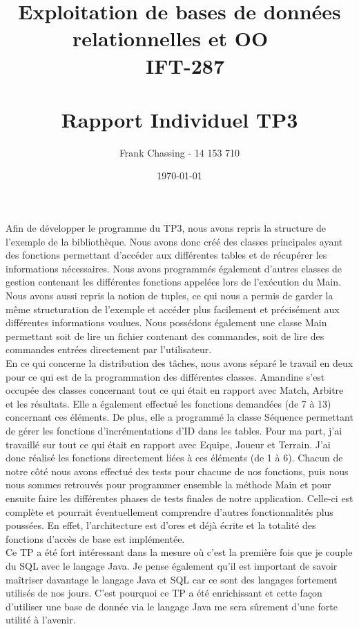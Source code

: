 \documentclass[11pt]{article}
\title{Exploitation de bases de données relationnelles et OO ~\\~\textbf{IFT-287} \\~\\ Rapport Individuel TP3}
\author{Frank Chassing - 14 153 710}
\date{\today}
\begin{document}
\maketitle
Afin de développer le programme du TP3, nous avons repris la structure de l’exemple de la bibliothèque. Nous avons donc créé des classes principales ayant des fonctions permettant d’accéder aux différentes tables et de récupérer les informations nécessaires. Nous avons programmés également d’autres classes de gestion contenant les différentes fonctions appelées lors de l’exécution du Main. Nous avons aussi repris la notion de tuples,  ce qui nous a permis de garder la même structuration de l’exemple et accéder plus facilement et précisément aux différentes informations voulues. Nous possédons également une classe Main permettant soit de lire un fichier contenant des commandes, soit de lire des commandes entrées directement par l’utilisateur.~\\

En ce qui concerne la distribution des tâches, nous avons séparé le travail en deux pour ce qui est de la programmation des différentes classes. Amandine s’est occupée des classes concernant tout ce qui était en rapport avec Match, Arbitre et les résultats. Elle a également effectué les fonctions demandées (de 7 à 13) concernant ces éléments. De plus, elle a programmé la classe Séquence permettant de gérer les fonctions d’incrémentations d’ID dans les tables. Pour ma part, j’ai travaillé sur tout ce qui était en rapport avec Equipe, Joueur et Terrain. J’ai donc réalisé les fonctions directement liées à ces éléments (de 1 à 6). Chacun de notre côté nous avons effectué des tests pour chacune de nos fonctions, puis nous nous sommes retrouvés pour programmer ensemble la méthode Main et pour ensuite faire les différentes phases de tests finales de notre application. Celle-ci est complète et pourrait éventuellement comprendre d’autres fonctionnalités plus poussées. En effet, l’architecture est d’ores et déjà écrite et la totalité des fonctions d’accès de base est implémentée.~\\

Ce TP a été fort intéressant dans la mesure où c’est la première fois que je couple du SQL avec le langage Java. Je pense également qu’il est important de savoir maîtriser davantage le langage Java et SQL car ce sont des langages fortement utilisés de nos jours. C’est pourquoi ce TP a été enrichissant et cette façon d’utiliser une base de donnée via le langage Java me sera sûrement d’une forte utilité à l’avenir.
\end{document}
